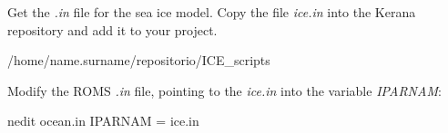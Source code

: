  Get the \textit{.in} file for the sea ice model. Copy the file \textit{ice.in} into the Kerana repository and add it to your project.
\bigskip

\begin{bashcode}
    /home/name.surname/repositorio/ICE_scripts
\end{bashcode}
\bigskip
    
 Modify the ROMS \textit{.in} file, pointing to the \textit{ice.in} into the variable \textit{IPARNAM}:
\bigskip

\begin{bashcode}
nedit ocean.in
IPARNAM =  ice.in
\end{bashcode}